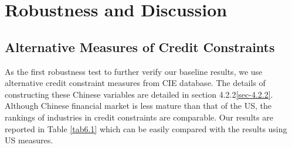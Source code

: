 \chapter{Robustness and Discussion}\label{sec-6.robustness}

\section{Alternative Measures of Credit Constraints}

As the first robustness test to further verify our baseline results, we use alternative credit constraint measures from CIE database. The details of constructing these Chinese variables are detailed in section 4.2.2\ref{sec-4.2.2}. Although Chinese financial market is less mature than that of the US, the rankings of industries in credit constraints are comparable. Our results are reported in Table \ref{tab6.1} which can be easily compared with the results using US measures.

